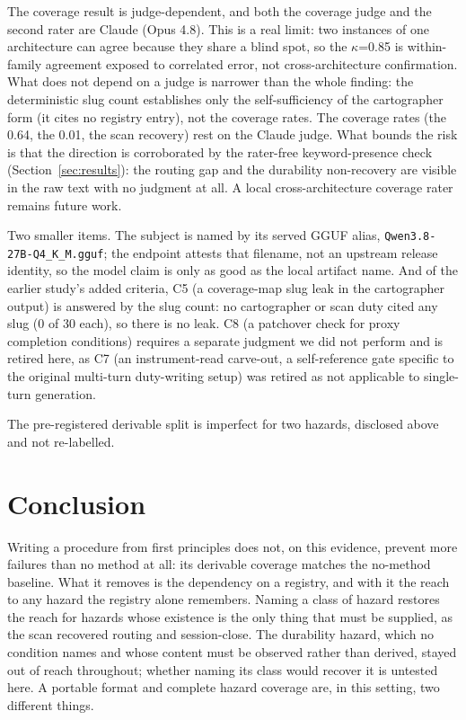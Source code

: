 \documentclass[11pt,a4paper]{article}
\begin{document}
The coverage result is judge-dependent, and both the coverage judge and the
second rater are Claude (Opus 4.8). This is a real limit: two instances of one
architecture can agree because they share a blind spot, so the $\kappa$=0.85 is
within-family agreement exposed to correlated error, not cross-architecture
confirmation. What does not depend on a judge is narrower than the whole finding:
the deterministic slug count establishes only the self-sufficiency of the
cartographer form (it cites no registry entry), not the coverage rates. The
coverage rates (the 0.64, the 0.01, the scan recovery) rest on the Claude judge.
What bounds the risk is that the direction is
corroborated by the rater-free keyword-presence check (Section~\ref{sec:results}):
the routing gap and the durability non-recovery are visible in the raw text with
no judgment at all. A local cross-architecture coverage rater remains future
work.

Two smaller items. The subject is named by its served GGUF alias,
\texttt{Qwen3.8-27B-Q4\_K\_M.gguf}; the endpoint attests that filename, not an
upstream release identity, so the model claim is only as good as the local
artifact name. And of the earlier study's added criteria, C5 (a coverage-map
slug leak in the cartographer output) is answered by the slug count: no
cartographer or scan duty cited any slug (0 of 30 each), so there is no leak.
C8 (a patchover check for proxy completion conditions) requires a separate
judgment we did not perform and is retired here, as C7 (an instrument-read
carve-out, a self-reference gate specific to the original multi-turn
duty-writing setup) was retired as not applicable to single-turn generation.

The pre-registered derivable split is imperfect for two hazards, disclosed above
and not re-labelled.

\section{Conclusion}

Writing a procedure from first principles does not, on this evidence, prevent
more failures than no method at all: its derivable coverage matches the no-method
baseline. What it removes is the dependency on a registry, and with it the reach
to any hazard the registry alone remembers. Naming a class of hazard restores the
reach for hazards whose existence is the only thing that must be supplied, as the
scan recovered routing and session-close. The durability hazard, which no
condition names and whose content must be observed rather than derived, stayed
out of reach throughout; whether naming its class would recover it is untested
here. A portable format and complete hazard coverage are, in this setting, two
different things.
\end{document}
